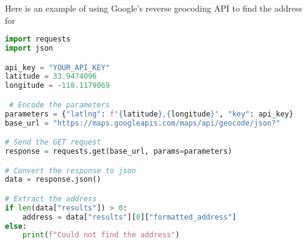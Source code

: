 Here is an example of using Google's reverse geocoding API to find the address for 

\begin{lstlisting}[language=Python]
import requests
import json

api_key = "YOUR_API_KEY"
latitude = 33.9474096
longitude = -118.1179069

 # Encode the parameters
parameters = {"latlng": f"{latitude},{longitude}", "key": api_key}
base_url = "https://maps.googleapis.com/maps/api/geocode/json?"

# Send the GET request
response = requests.get(base_url, params=parameters)

# Convert the response to json
data = response.json()

# Extract the address
if len(data["results"]) > 0:
    address = data["results"][0]["formatted_address"]
else:
    print(f"Could not find the address")
\end{lstlisting}
